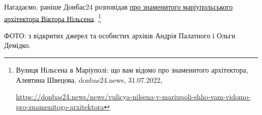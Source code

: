 
Нагадаємо, раніше Донбас24 розповідав \href{https://donbas24.news/news/vulicya-nilsena-v-mariupoli-shho-vam-vidomo-pro-znamenitogo-arxitektora}{про знаменитого маріупольського
архітектора Віктора Нільсена}.%
\footnote{Вулиця Нільсена в Маріуполі: що вам відомо про знаменитого архітектора, Алевтина Швецова, %
donbas24.news, 31.07.2022, \par%
\url{https://donbas24.news/news/vulicya-nilsena-v-mariupoli-shho-vam-vidomo-pro-znamenitogo-arxitektora}}

ФОТО: з відкритих джерел та особистих архівів Андрія Палатного і Ольги Демідко.

